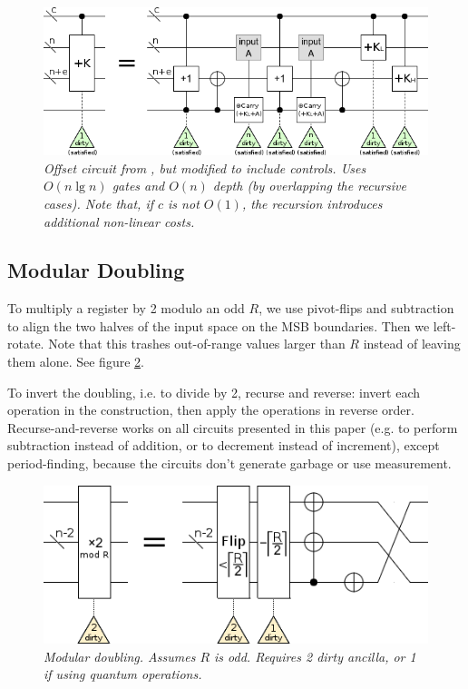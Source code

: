 \documentclass[twocolumn]{article}
\begin{document}
\begin{figure}
  \centering
  \includegraphics[width=\linewidth]{assets/controlled-offset.png}
  \caption{\em
      Offset circuit from \cite{haner2016}, but modified to include controls.
      Uses $O(n \lg n)$ gates and $O(n)$ depth (by overlapping the recursive cases).
      Note that, if $c$ is not $O(1)$, the recursion introduces additional non-linear costs.
  }
  \label{fig:controlled-offset}
\end{figure}

\subsection{Modular Doubling}

To multiply a register by 2 modulo an odd $R$, we use pivot-flips and subtraction to align the two halves of the input space on the MSB boundaries.
Then we left-rotate.
Note that this trashes out-of-range values larger than $R$ instead of leaving them alone.
See figure \ref{fig:modular-double}.

To invert the doubling, i.e. to divide by 2, recurse and reverse: invert each operation in the construction, then apply the operations in reverse order. 
Recurse-and-reverse works on all circuits presented in this paper (e.g. to perform subtraction instead of addition, or to decrement instead of increment), except period-finding, because the circuits don't generate garbage or use measurement.

\begin{figure}
  \centering
  \includegraphics[width=\linewidth]{assets/modular-double.png}
  \caption{\em
    Modular doubling.
    Assumes $R$ is odd.
    Requires 2 dirty ancilla, or 1 if using quantum operations.
  }
  \label{fig:modular-double}
\end{figure}
\end{document}
